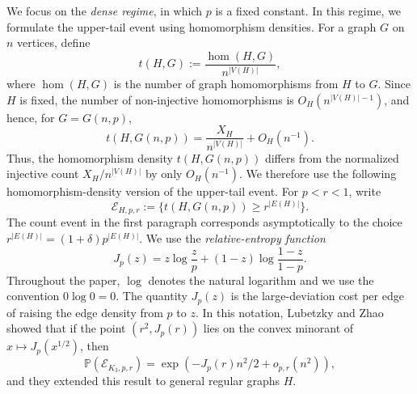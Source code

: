 We focus on the \emph{dense regime}, in which $p$ is a fixed constant.
In this regime, we formulate the upper-tail event using
homomorphism densities.  For a graph $G$ on $n$ vertices, define
\[
  t(H,G):=\frac{\hom(H,G)}{n^{|V(H)|}},
\]
where $\hom(H,G)$ is the number of graph homomorphisms from $H$ to $G$.
Since $H$ is fixed, the number of non-injective homomorphisms is
$O_H(n^{|V(H)|-1})$, and hence, for $G=G(n,p)$,
\[
  t(H,G(n,p))=\frac{X_H}{n^{|V(H)|}}+O_H(n^{-1}).
\]
Thus, the homomorphism density $t(H,G(n,p))$ differs from the normalized
injective count $X_H/n^{|V(H)|}$ by only $O_H(n^{-1})$.  We therefore
use the following homomorphism-density version of the upper-tail event.  For
$p<r<1$, write
\[
  \mathcal E_{H,p,r}:=
  \{t(H,G(n,p))\ge r^{|E(H)|}\}.
\]
The count event in the first paragraph corresponds asymptotically to the
choice $r^{|E(H)|}=(1+\delta)p^{|E(H)|}$. We use the
\emph{relative-entropy function}
\[
  J_p(z) = z \log \frac{z}{p} + (1-z) \log \frac{1-z}{1-p}.
\]
Throughout the paper, $\log$ denotes the natural logarithm and we use the
convention $0\log0=0$.  The quantity $J_p(z)$ is the large-deviation cost per edge of
raising the edge density from $p$ to $z$.  In this notation, Lubetzky and
Zhao~\cite{lubetzky2015large} showed that if the point $(r^2, J_p(r))$ lies on
the convex minorant of $x \mapsto J_p(x^{1/2})$, then
\[
  \mathbb{P}(\mathcal E_{K_3,p,r})
  =\exp(-J_p(r)n^2/2+o_{p,r}(n^2)),
\]
and they extended this result to general regular graphs $H$.



